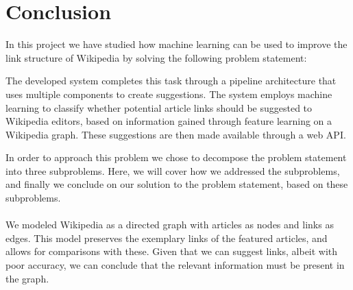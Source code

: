 \chapter{Conclusion}\label{chap:conclusion}
In this project we have studied how machine learning can be used to improve the link structure of Wikipedia by solving the following problem statement:
\problemstatement

The developed system completes this task through a pipeline architecture that uses multiple components to create suggestions. The system employs machine learning to classify whether potential article links should be suggested to Wikipedia editors, based on information gained through feature learning on a Wikipedia graph. These suggestions are then made available through a web API.

In order to approach this problem we chose to decompose the problem statement into three subproblems. Here, we will cover how we addressed the subproblems, and finally we conclude on our solution to the problem statement, based on these subproblems.

\subsubsection*{\subproblemone}
We modeled Wikipedia as a directed graph with articles as nodes and links as edges. This model preserves the exemplary links of the featured articles, and allows for comparisons with these. Given that we can suggest links, albeit with poor accuracy, we can conclude that the relevant information must be present in the graph.

